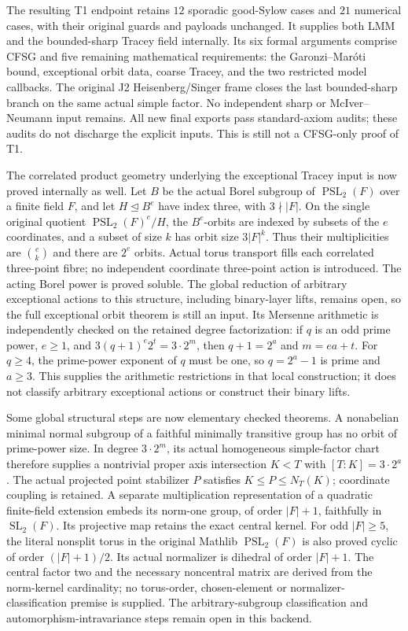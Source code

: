 The resulting T1 endpoint retains $12$ sporadic good-Sylow cases and
$21$ numerical cases, with their original guards and payloads unchanged.
It supplies both LMM and the bounded-sharp Tracey field internally.
Its six formal arguments comprise CFSG and five remaining mathematical
requirements: the Garonzi--Mar\'oti bound, exceptional orbit data, coarse
Tracey, and the two restricted model callbacks. The original J2
Heisenberg/Singer frame closes the last bounded-sharp branch on the
same actual simple factor. No independent sharp or McIver--Neumann
input remains.
All new final exports pass standard-axiom audits; these audits do not
discharge the explicit inputs. This is still not a CFSG-only proof of T1.

The correlated product geometry underlying the exceptional Tracey input
is now proved internally as well. Let $B$ be the actual Borel subgroup
of $\operatorname{PSL}_2(F)$ over a finite field $F$, and let
$H\mathrel{\unlhd}B^e$ have index
three, with $3\nmid|F|$. On the single original quotient
$\operatorname{PSL}_2(F)^e/H$, the $B^e$-orbits are indexed by subsets
of the $e$ coordinates, and a subset of size $k$ has orbit size
$3|F|^k$. Thus their multiplicities are $\binom ek$ and there are $2^e$
orbits. Actual torus transport fills each correlated three-point fibre;
no independent coordinate three-point action is introduced. The acting
Borel power is proved soluble. The global reduction of arbitrary
exceptional actions to this structure, including binary-layer lifts,
remains open, so the full exceptional orbit theorem is still an input.
Its Mersenne arithmetic is independently checked on the retained degree
factorization: if $q$ is an odd prime power, $e\ge1$, and
$3(q+1)^e2^t=3\cdot2^m$, then $q+1=2^a$ and $m=ea+t$.
For $q\ge4$, the prime-power exponent of $q$ must be one, so $q=2^a-1$
is prime and $a\ge3$. This supplies the arithmetic restrictions in that
local construction; it does not classify arbitrary exceptional actions
or construct their binary lifts.

Some global structural steps are now elementary checked theorems.
A nonabelian minimal normal subgroup of a faithful minimally transitive
group has no orbit of prime-power size. In degree $3\cdot2^m$, its
actual homogeneous simple-factor chart therefore supplies a nontrivial
proper axis intersection $K<T$ with $[T:K]=3\cdot2^a$.
The actual projected point stabilizer $P$ satisfies
$K\le P\le N_T(K)$; coordinate coupling is retained.
A separate multiplication representation of a quadratic finite-field
extension embeds its norm-one group, of order $|F|+1$, faithfully in
$\operatorname{SL}_2(F)$. Its projective map retains the exact central
kernel. For odd $|F|\ge5$, the literal nonsplit torus in the original
Mathlib $\operatorname{PSL}_2(F)$ is also proved cyclic of order
$(|F|+1)/2$. Its actual normalizer is dihedral of order $|F|+1$.
The central factor two and the necessary noncentral matrix are derived
from the norm-kernel cardinality; no torus-order, chosen-element or
normalizer-classification premise is supplied. The arbitrary-subgroup
classification and automorphism-intravariance steps remain open in this
backend.

